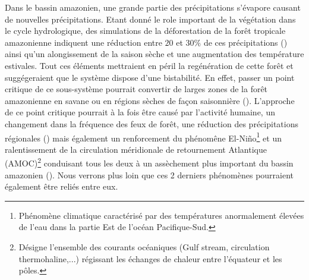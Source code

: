 Dans le bassin amazonien, une grande partie des précipitations s'évapore causant de nouvelles précipitations. Etant donné le role important de la végétation dans le cycle hydrologique, des simulations de la déforestation de la forêt tropicale amazonienne indiquent une réduction entre $20$ et $30\%$ de ces précipitations (\cite{zeng_climatic_1996}) ainsi qu'un alongissement de la saison sèche et une augmentation des température estivales. Tout ces éléments mettraient en péril la regénération de cette forêt et suggégeraient que le système dispose d'une bistabilité. En effet, passer un point critique de ce sous-système pourrait convertir de larges zones de la forêt amazonienne en savane ou en régions sèches de façon saisonnière (\cite{steffen_trajectories_2018}). L'approche de ce point critique pourrait à la fois être causé par l'activité humaine, un changement dans la fréquence des feux de forêt, une réduction des précipitations régionales (\cite{lenton_tipping_2008}) mais également un renforcement du phénomêne El-Niño\footnote{Phénomène climatique caractérisé par des températures anormalement élevées de l'eau dans la partie Est de l'océan Pacifique-Sud.} et un ralentissement de la circulation méridionale de retournement Atlantique (AMOC)\footnote{Désigne l'ensemble des courants océaniques (Gulf stream, circulation thermohaline,...) régissant les échanges de chaleur entre l'équateur et les pôles.} conduisant tous les deux à un assèchement plus important du bassin amazonien (\cite{lenton_tipping_2008, lenton_climate_2019_too_risky}). Nous verrons plus loin que ces 2 derniers phénomènes pourraient également être reliés entre eux.


